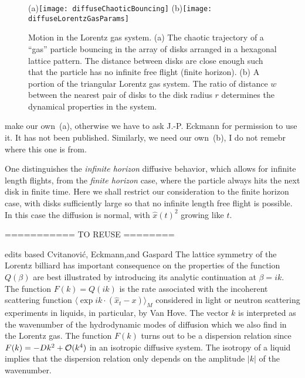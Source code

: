 

\begin{figure}[htbp]
  \begin{center}
    (a)\texttt{[image: diffuseChaoticBouncing]}
    (b)\texttt{[image: diffuseLorentzGasParams]}
  \end{center}
  \caption[]{\label{fig-chaoticBouncing}
  Motion in the Lorentz gas system. (a)  The chaotic trajectory of a
  ``gas'' particle bouncing in the array of disks  arranged in a
  hexagonal lattice pattern. The distance between disks are close  enough
  such that the particle has no infinite free flight (finite horizon).
  (b) A portion of the triangular Lorentz gas    system. The ratio of
  distance $w$ between the nearest pair of disks to the    disk radius
  $r$ determines the dynamical properties in the system.
  }
\end{figure}
     {make our own \,(a), otherwise
    we have to ask J.-P. Eckmann for permission to use it. It has not been
    published. Similarly, we need our own \,(b),
    I do not remebr where this one is from.}

One distinguishes
the {\em infinite horizon} diffusive behavior, which allows for infinite
length flights, from
the {\em finite horizon} case, where the particle always
hits the next disk in finite time.
Here we shall restrict
our consideration to the finite horizon case,
with disks sufficiently
large so that no infinite length free flight is possible.
In this case the diffusion is normal, with $\hat{x}(t)^2$
growing like $t$.


\bigskip
=========== TO REUSE ========

    {edits based Cvitanovi\'c,  Eckmann,and Gaspard}
The lattice symmetry of the Lorentz billiard has important consequence on
the properties of the function $Q(\beta)$ are best illustrated by
introducing its analytic continuation at $\beta = i k$.  The function
$F(k)=Q(ik)$ is the rate associated with the incoherent scattering
function $\langle \exp i k \cdot (\hat x_t - x) \rangle_M$ considered in
light or neutron scattering experiments in liquids, in particular, by Van
Hove. The vector $k$ is interpreted as the
wavenumber of the hydrodynamic modes of diffusion which we also find in
the Lorentz gas.  The function $F(k)$ turns out to be a dispersion
relation since $F(k)=-D k^2 + {\cal O}(k^4)$ in an isotropic diffusive
system.  The isotropy of a liquid implies that the dispersion relation
only depends on the amplitude $\vert k\vert$ of the wavenumber.


